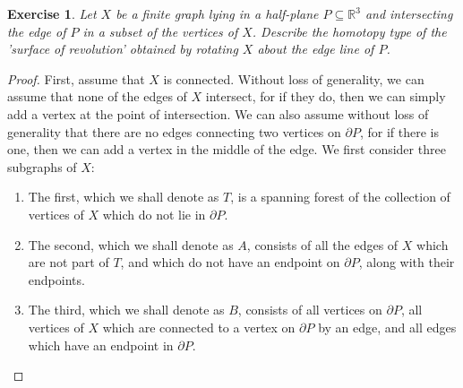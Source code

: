 \documentclass{article}
\newtheorem{exercise}{Exercise}[subsection]
\begin{document}
\begin{exercise}
Let $X$ be a finite graph lying in a half-plane $P\subseteq \mathbb{R}^3$ and intersecting the edge of $P$ in a subset of the vertices of $X$. Describe the homotopy type of the 'surface of revolution' obtained by rotating $X$ about the edge line of $P$.
\end{exercise}
\begin{proof}
First, assume that $X$ is connected. Without loss of generality, we can assume that none of the edges of $X$ intersect, for if they do, then we can simply add a vertex at the point of intersection. We can also assume without loss of generality that there are no edges connecting two vertices on $\partial P$, for if there is one, then we can add a vertex in the middle of the edge. We first consider three subgraphs of $X$:
\begin{enumerate}
\item The first, which we shall denote as $T$, is a spanning forest of the collection of vertices of $X$ which do not lie in $\partial P$.
\item The second, which we shall denote as $A$, consists of all the edges of $X$ which are not part of $T$, and which do not have an endpoint on $\partial P$, along with their endpoints.
\item The third, which we shall denote as $B$, consists of all vertices on $\partial P$, all vertices of $X$ which are connected to a vertex on $\partial P$ by an edge, and all edges which have an endpoint in $\partial P$.

\end{enumerate}
\end{proof}
\end{document}
